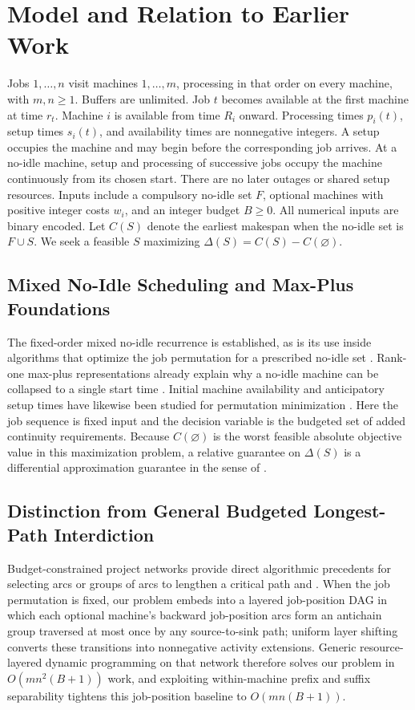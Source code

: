 \documentclass[11pt,letterpaper]{article}
\begin{document}
\section{Model and Relation to Earlier Work}
\label{sec:model}

Jobs $1,\ldots,n$ visit machines $1,\ldots,m$, processing in that order on every machine, with $m,n\ge 1$. Buffers are unlimited. Job $t$ becomes available at the first machine at time $r_t$. Machine $i$ is available from time $R_i$ onward. Processing times $p_i(t)$, setup times $s_i(t)$, and availability times are nonnegative integers. A setup occupies the machine and may begin before the corresponding job arrives. At a no-idle machine, setup and processing of successive jobs occupy the machine continuously from its chosen start. There are no later outages or shared setup resources. Inputs include a compulsory no-idle set $F$, optional machines with positive integer costs $w_i$, and an integer budget $B\ge 0$. All numerical inputs are binary encoded. Let $C(S)$ denote the earliest makespan when the no-idle set is $F\cup S$. We seek a feasible $S$ maximizing $\Delta(S)=C(S)-C(\varnothing)$.

\subsection{Mixed No-Idle Scheduling and Max-Plus Foundations}

The fixed-order mixed no-idle recurrence is established, as is its use inside algorithms that optimize the job permutation for a prescribed no-idle set \citep{Pan2014,Bektas2020}. Rank-one max-plus representations already explain why a no-idle machine can be collapsed to a single start time \citep{Kubo2018,Kubo2018Thesis}. Initial machine availability and anticipatory setup times have likewise been studied for permutation minimization \citep{PerezGonzalez2009,Wang2007}. Here the job sequence is fixed input and the decision variable is the budgeted set of added continuity requirements. Because $C(\varnothing)$ is the worst feasible absolute objective value in this maximization problem, a relative guarantee on $\Delta(S)$ is a differential approximation guarantee in the sense of \citet{Demange1996}.

\subsection{Distinction from General Budgeted Longest-Path Interdiction}

Budget-constrained project networks provide direct algorithmic precedents for selecting arcs or groups of arcs to lengthen a critical path \citep[][\S4]{Brown2005} and \citet{Wu2026}. When the job permutation is fixed, our problem embeds into a layered job-position DAG in which each optional machine's backward job-position arcs form an antichain group traversed at most once by any source-to-sink path; uniform layer shifting converts these transitions into nonnegative activity extensions. Generic resource-layered dynamic programming on that network therefore solves our problem in $O(mn^2(B+1))$ work, and exploiting within-machine prefix and suffix separability tightens this job-position baseline to $O(mn(B+1))$.
\end{document}
